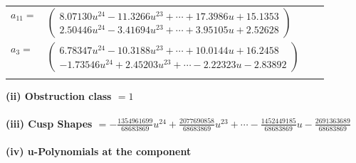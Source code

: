 \documentclass[1p]{elsarticle_modified}
\theoremstyle{definition}
\begin{document}
\begin{tabular}{m{7pt} m{180pt} m{7pt} m{180pt} }
\flushright $a_{11}=$&$\begin{pmatrix}8.07130 u^{24}-11.3266 u^{23}+\cdots+17.3986 u+15.1353\\2.50446 u^{24}-3.41694 u^{23}+\cdots+3.95105 u+2.52628\end{pmatrix}$ \\
\flushright $a_{3}=$&$\begin{pmatrix}6.78347 u^{24}-10.3188 u^{23}+\cdots+10.0144 u+16.2458\\-1.73546 u^{24}+2.45203 u^{23}+\cdots-2.22323 u-2.83892\end{pmatrix}$\\&\end{tabular}
\flushleft \textbf{(ii) Obstruction class $= 1$}\\~\\
\flushleft \textbf{(iii) Cusp Shapes $= -\frac{1354961699}{68683869} u^{24}+\frac{2077690858}{68683869} u^{23}+\cdots-\frac{1452449185}{68683869} u-\frac{2691363689}{68683869}$}\\~\\
\newpage\renewcommand{\arraystretch}{1}
\flushleft \textbf{(iv) u-Polynomials at the component}\newline \\
\end{document}
